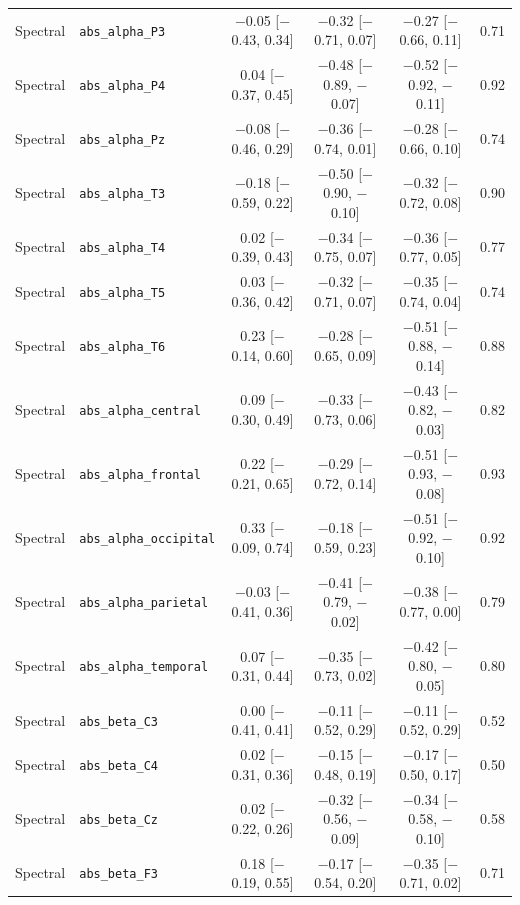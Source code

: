 {\begin{longtable}{llcccc}
Spectral & \texttt{abs\_alpha\_P3} & $-$0.05 [$-$0.43, 0.34] & $-$0.32 [$-$0.71, 0.07] & $-$0.27 [$-$0.66, 0.11] & 0.71 \\
Spectral & \texttt{abs\_alpha\_P4} & 0.04 [$-$0.37, 0.45] & $-$0.48 [$-$0.89, $-$0.07] & $-$0.52 [$-$0.92, $-$0.11] & 0.92 \\
Spectral & \texttt{abs\_alpha\_Pz} & $-$0.08 [$-$0.46, 0.29] & $-$0.36 [$-$0.74, 0.01] & $-$0.28 [$-$0.66, 0.10] & 0.74 \\
Spectral & \texttt{abs\_alpha\_T3} & $-$0.18 [$-$0.59, 0.22] & $-$0.50 [$-$0.90, $-$0.10] & $-$0.32 [$-$0.72, 0.08] & 0.90 \\
Spectral & \texttt{abs\_alpha\_T4} & 0.02 [$-$0.39, 0.43] & $-$0.34 [$-$0.75, 0.07] & $-$0.36 [$-$0.77, 0.05] & 0.77 \\
Spectral & \texttt{abs\_alpha\_T5} & 0.03 [$-$0.36, 0.42] & $-$0.32 [$-$0.71, 0.07] & $-$0.35 [$-$0.74, 0.04] & 0.74 \\
Spectral & \texttt{abs\_alpha\_T6} & 0.23 [$-$0.14, 0.60] & $-$0.28 [$-$0.65, 0.09] & $-$0.51 [$-$0.88, $-$0.14] & 0.88 \\
Spectral & \texttt{abs\_alpha\_central} & 0.09 [$-$0.30, 0.49] & $-$0.33 [$-$0.73, 0.06] & $-$0.43 [$-$0.82, $-$0.03] & 0.82 \\
Spectral & \texttt{abs\_alpha\_frontal} & 0.22 [$-$0.21, 0.65] & $-$0.29 [$-$0.72, 0.14] & $-$0.51 [$-$0.93, $-$0.08] & 0.93 \\
Spectral & \texttt{abs\_alpha\_occipital} & 0.33 [$-$0.09, 0.74] & $-$0.18 [$-$0.59, 0.23] & $-$0.51 [$-$0.92, $-$0.10] & 0.92 \\
Spectral & \texttt{abs\_alpha\_parietal} & $-$0.03 [$-$0.41, 0.36] & $-$0.41 [$-$0.79, $-$0.02] & $-$0.38 [$-$0.77, 0.00] & 0.79 \\
Spectral & \texttt{abs\_alpha\_temporal} & 0.07 [$-$0.31, 0.44] & $-$0.35 [$-$0.73, 0.02] & $-$0.42 [$-$0.80, $-$0.05] & 0.80 \\
Spectral & \texttt{abs\_beta\_C3} & 0.00 [$-$0.41, 0.41] & $-$0.11 [$-$0.52, 0.29] & $-$0.11 [$-$0.52, 0.29] & 0.52 \\
Spectral & \texttt{abs\_beta\_C4} & 0.02 [$-$0.31, 0.36] & $-$0.15 [$-$0.48, 0.19] & $-$0.17 [$-$0.50, 0.17] & 0.50 \\
Spectral & \texttt{abs\_beta\_Cz} & 0.02 [$-$0.22, 0.26] & $-$0.32 [$-$0.56, $-$0.09] & $-$0.34 [$-$0.58, $-$0.10] & 0.58 \\
Spectral & \texttt{abs\_beta\_F3} & 0.18 [$-$0.19, 0.55] & $-$0.17 [$-$0.54, 0.20] & $-$0.35 [$-$0.71, 0.02] & 0.71 \\

\end{longtable}}
